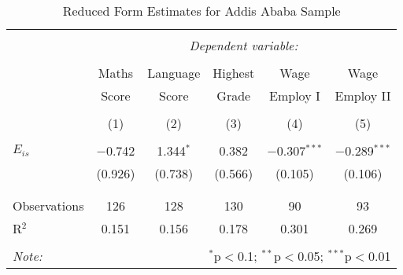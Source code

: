 

\begin{table}[!htbp] \centering 
  \caption{Reduced Form Estimates for Addis Ababa Sample} 
  \label{} 
\begin{tabular}{@{\extracolsep{5pt}}lccccc} 
\\[-1.8ex]\hline 
\hline \\[-1.8ex] 
 & \multicolumn{5}{c}{\textit{Dependent variable:}} \\ 
\cline{2-6} 
\\[-1.8ex] & Maths & Language & Highest & Wage & Wage \\ 
 & Score & Score & Grade & Employ I & Employ II \\
\\[-1.8ex] & (1) & (2) & (3) & (4) & (5)\\ 
\hline \\[-1.8ex] 
 $E_{is}$ & $-$0.742 & 1.344$^{*}$ & 0.382 & $-$0.307$^{***}$ & $-$0.289$^{***}$ \\ 
  & (0.926) & (0.738) & (0.566) & (0.105) & (0.106) \\ 
  & & & & & \\ 
\hline \\[-1.8ex] 
Observations & 126 & 128 & 130 & 90 & 93 \\ 
R$^{2}$ & 0.151 & 0.156 & 0.178 & 0.301 & 0.269 \\ 
\hline 
\hline \\[-1.8ex] 
\textit{Note:}  & \multicolumn{5}{r}{$^{*}$p$<$0.1; $^{**}$p$<$0.05; $^{***}$p$<$0.01} \\ 
\end{tabular} 
\end{table} 



